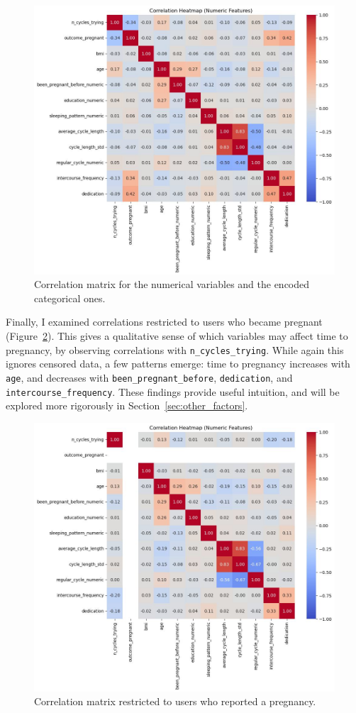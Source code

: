 \documentclass[11pt]{article}
\begin{document}
\begin{figure}
  \centering
  \includegraphics[width=0.65\linewidth]{plots/correlation_matrix_new_variables.jpg}
  \caption{
  Correlation matrix for the numerical variables and the encoded categorical ones.\\
  } 
    \label{fig:correlation_matrix}
\end{figure}

Finally, I examined correlations restricted to users who became pregnant (Figure~\ref{fig:correlation_matrix_new_variables_outcome_pregnant}). This gives a qualitative sense of which variables may affect time to pregnancy, by observing correlations with \texttt{n\_cycles\_trying}. While again this ignores censored data, a few patterns emerge: time to pregnancy increases with \texttt{age}, and decreases with \texttt{been\_pregnant\_before}, \texttt{dedication}, and \texttt{intercourse\_frequency}. These findings provide useful intuition, and will be explored more rigorously in Section~\ref{sec:other_factors}.

\begin{figure}
  \centering
  \includegraphics[width=0.65\linewidth]{plots/correlation_matrix_new_variables_outcome_pregnant.jpg}
  \caption{
  Correlation matrix restricted to users who reported a pregnancy.\\
  } 
    \label{fig:correlation_matrix_new_variables_outcome_pregnant}
\end{figure}
\end{document}
